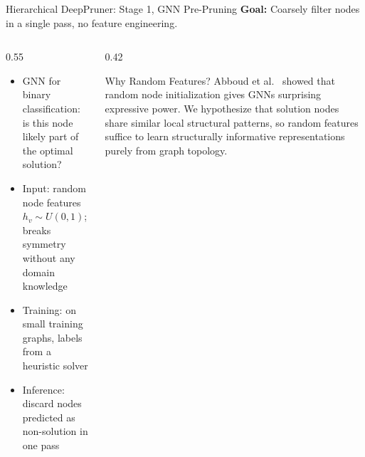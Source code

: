 \documentclass[aspectratio=169,xcolor=dvipsnames,8pt]{beamer}
\begin{document}
\begin{frame}{Hierarchical DeepPruner: Stage 1, GNN Pre-Pruning}
  \textbf{Goal:} Coarsely filter nodes in a single pass, no feature engineering.

  \vspace{0.3cm}

  \begin{columns}
    \begin{column}{0.55\textwidth}
      \begin{itemize}
        \item GNN for binary classification: is this node likely
          part of the optimal solution?
        \item Input: random node features $h_v \sim U(0,1)$;
          breaks symmetry without any domain knowledge
        \item Training: on small training graphs,
          labels from a heuristic solver
        \item Inference: discard nodes predicted as non-solution in one pass
      \end{itemize}
    \end{column}
    \begin{column}{0.42\textwidth}
      \begin{exampleblock}{Why Random Features?}
        Abboud et al.~\cite{abboud2020surprising} showed that random node
        initialization gives GNNs surprising expressive power. We hypothesize
        that solution nodes share similar local structural patterns,
        so random features suffice to learn structurally informative
        representations purely from graph topology.
      \end{exampleblock}
    \end{column}
  \end{columns}
\end{frame}
\end{document}
